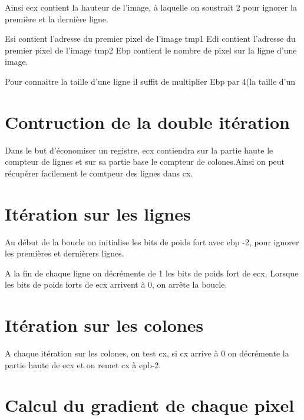\documentclass[11pt]{report}
\begin{document}
Ainsi ecx contient la hauteur de l'image, à laquelle on soustrait 2 pour ignorer la première et la dernière ligne.

Esi contient l'adresse du premier pixel de l'image tmp1
Edi contient l'adresse du premier pixel de l'image tmp2
Ebp contient le nombre de pixel sur la ligne d'une image.

Pour connaitre la taille d'une ligne il suffit de multiplier Ebp par 4(la taille d'un


\section{Contruction de la double itération}

Dans le but d'économiser un registre, ecx contiendra sur la partie haute le compteur de lignes et sur sa partie base le compteur de colones.Ainsi on peut récupérer facilement le comtpeur des lignes dans cx.





\section{Itération sur les lignes}

Au début de la boucle on initialise les bits de poids fort avec ebp -2, pour ignorer les premières et dernièrers lignes.

A la fin de chaque ligne on décrémente de 1 les bits de poids fort de ecx. Lorsque les bits de poids forts de ecx arrivent à 0, on arrête la boucle.

\section{Itération sur les colones}
A chaque itération sur les colones, on test cx, si cx arrive à 0 on décrémente la partie haute de ecx et on remet cx à epb-2.
\section{Calcul du gradient de chaque pixel}
\end{document}
